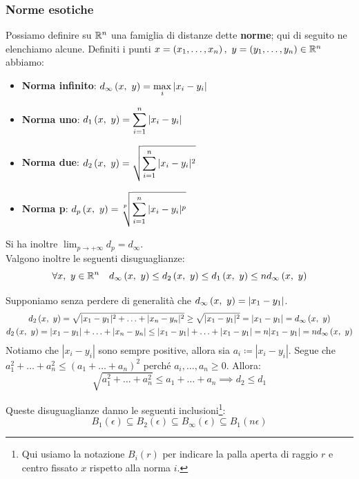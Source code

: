 \subsubsection{Norme esotiche}
Possiamo definire su $\mathbb{R}^n$ una famiglia di distanze dette \textbf{norme}; qui di seguito ne elenchiamo alcune. Definiti i punti $x=\left(x_1,\ldots, x_n\right),\ y=\left(y_1,\ldots, y_n\right)\in\realset^n$ abbiamo:
\begin{itemize}
	\item \textbf{Norma infinito}: $\displaystyle d_\infty\left(x,\ y\right)=\max_{i}{|x_i-y_i|}$
	\item \textbf{Norma uno}: $\displaystyle d_1\left(x,\ y\right)=\sum_{i=1}^{n}|x_i-y_i|$
	\item \textbf{Norma due}: $\displaystyle d_2\left(x,\ y\right)=\sqrt{\sum_{i=1}^{n}|x_i-y_i|^2}$
	\item \textbf{Norma p}: $\displaystyle\mvf{d_p}{x}{y}=\sqrt[\leftroot{1}\uproot{3}p]{\sum_{i=1}^{n}|x_i-y_i|^p}$
\end{itemize}
Si ha inoltre $\displaystyle \lim_{p \to +\infty}d_p=d_\infty$.\\
Valgono inoltre le seguenti disuguaglianze:
\begin{equation}
	\forall x,\ y\in\mathbb{R}^n\quad d_\infty\left(x,\ y\right)\leq d_2\left(x,\ y\right)\leq d_1\left(x,\ y\right)\leq nd_\infty\left(x,\ y\right)
\end{equation}
\begin{demonstration}
	Supponiamo senza perdere di generalità che $d_\infty\left(x,\ y\right)=|x_1-y_1|$.
	\begin{gather*}
		d_2\left(x,\ y\right)=\sqrt{|x_1-y_1|^2+\ldots+|x_n-y_n|^2}\geq\sqrt{|x_1-y_1|^2}=|x_1-y_1|=d_\infty\left(x,\ y\right)\\
		d_2\left(x,\ y\right)=|x_1-y_1|+\ldots+|x_n-y_n|\leq|x_1-y_1|+\ldots+|x_1-y_1|=n|x_1-y_1|=nd_\infty\left(x,\ y\right)
	\end{gather*}
	Notiamo che $|x_i-y_i|$ sono sempre positive, allora sia $a_i\coloneqq|x_i-y_i|$. Segue che $a_1^2+\ldots+a_n^2\leq (a_1+\ldots+a_n)^2$ perché $a_i,\ldots,a_n\geq0$. Allora:
	\begin{equation*}
		\sqrt{a_1^2+\ldots+a_n^2}\leq a_1+\ldots+a_n\implies d_2\leq d_1
	\end{equation*}
\end{demonstration}
Queste disuguaglianze danno le seguenti inclusioni\footnote{Qui usiamo la notazione $B_i\left(r\right)$ per indicare la palla aperta di raggio $r$ e centro fissato $x$ rispetto alla norma $i$.}:
\begin{equation}
	B_1\left(\epsilon\right)\subseteq B_2\left(\epsilon\right)\subseteq B_\infty\left(\epsilon\right)\subseteq B_1\left(n\epsilon\right)
\end{equation}
